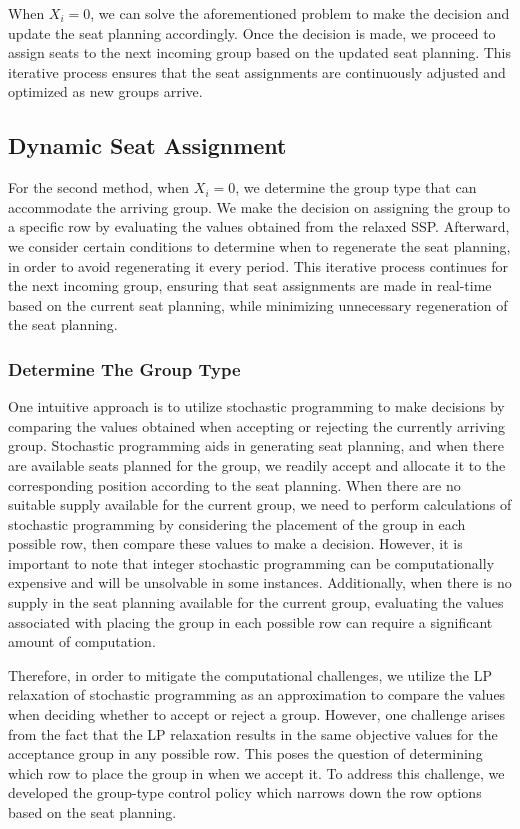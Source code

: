 When $X_i = 0$, we can solve the aforementioned problem to make the decision and update the seat planning accordingly. Once the decision is made, we proceed to assign seats to the next incoming group based on the updated seat planning. This iterative process ensures that the seat assignments are continuously adjusted and optimized as new groups arrive.

\subsection{Dynamic Seat Assignment}
For the second method, when $X_i = 0$, we determine the group type that can accommodate the arriving group. We make the decision on assigning the group to a specific row by evaluating the values obtained from the relaxed SSP. Afterward, we consider certain conditions to determine when to regenerate the seat planning, in order to avoid regenerating it every period. This iterative process continues for the next incoming group, ensuring that seat assignments are made in real-time based on the current seat planning, while minimizing unnecessary regeneration of the seat planning.

\subsubsection{Determine The Group Type}\label{nested_policy}
One intuitive approach is to utilize stochastic programming to make decisions by comparing the values obtained when accepting or rejecting the currently arriving group. Stochastic programming aids in generating seat planning, and when there are available seats planned for the group, we readily accept and allocate it to the corresponding position according to the seat planning. When there are no suitable supply available for the current group, we need to perform calculations of stochastic programming by considering the placement of the group in each possible row, then compare these values to make a decision. However, it is important to note that integer stochastic programming can be computationally expensive and will be unsolvable in some instances. Additionally, when there is no supply in the seat planning available for the current group, evaluating the values associated with placing the group in each possible row can require a significant amount of computation.

Therefore, in order to mitigate the computational challenges, we utilize the LP relaxation of stochastic programming as an approximation to compare the values when deciding whether to accept or reject a group. However, one challenge arises from the fact that the LP relaxation results in the same objective values for the acceptance group in any possible row. This poses the question of determining which row to place the group in when we accept it. To address this challenge, we developed the group-type control policy which narrows down the row options based on the seat planning.

